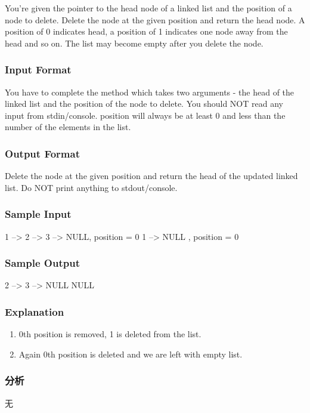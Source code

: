 You’re given the pointer to the head node of a linked list and the position of a node to delete. Delete the node at the given position and return the head node. A position of 0 indicates head, a position of 1 indicates one node away from the head and so on. The list may become empty after you delete the node.


\subsubsection{Input Format}
You have to complete the  method which takes two arguments - the head of the linked list and the position of the node to delete. You should NOT read any input from stdin/console. position will always be at least 0 and less than the number of the elements in the list.


\subsubsection{Output Format}
Delete the node at the given position and return the head of the updated linked list. Do NOT print anything to stdout/console.


\subsubsection{Sample Input}
\begin{Code}
1 –> 2 –> 3 –> NULL, position = 0
1 –> NULL , position = 0
\end{Code}


\subsubsection{Sample Output}
\begin{Code}
2 --> 3 --> NULL
NULL
\end{Code}


\subsubsection{Explanation}
\begin{enumerate}
\item 0th position is removed, 1 is deleted from the list.
\item Again 0th position is deleted and we are left with empty list.
\end{enumerate}


\subsubsection{分析}
无


